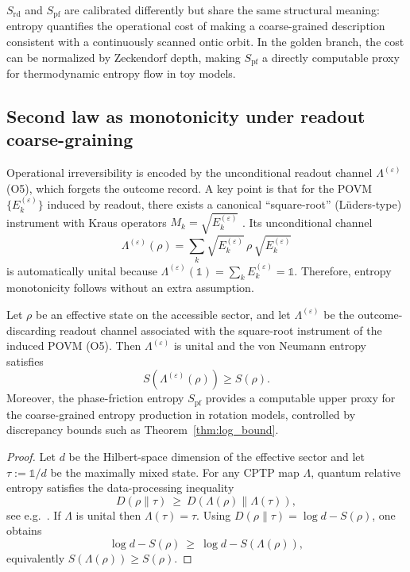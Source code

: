 \noindent $S_{\mathrm{rd}}$ and $S_{\mathrm{pf}}$ are calibrated differently but share the same structural meaning: entropy quantifies the operational cost of making a coarse-grained description consistent with a continuously scanned ontic orbit. In the golden branch, the cost can be normalized by Zeckendorf depth, making $S_{\mathrm{pf}}$ a directly computable proxy for thermodynamic entropy flow in toy models.

\subsection{Second law as monotonicity under readout coarse-graining}

Operational irreversibility is encoded by the unconditional readout channel $\Lambda^{(\varepsilon)}$ (O5), which forgets the outcome record. A key point is that for the POVM $\{E_k^{(\varepsilon)}\}$ induced by readout, there exists a canonical ``square-root'' (L\"uders-type) instrument with Kraus operators $M_k=\sqrt{E_k^{(\varepsilon)}}$ \cite{Kraus1983,NielsenChuang2000}. Its unconditional channel
\begin{equation}
  \Lambda^{(\varepsilon)}(\rho)=\sum_k \sqrt{E_k^{(\varepsilon)}}\,\rho\,\sqrt{E_k^{(\varepsilon)}}
\end{equation}
is automatically unital because $\Lambda^{(\varepsilon)}(\mathds{1})=\sum_k E_k^{(\varepsilon)}=\mathds{1}$. Therefore, entropy monotonicity follows without an extra assumption.

\begin{proposition}
\label{prop:second_law}
Let $\rho$ be an effective state on the accessible sector, and let $\Lambda^{(\varepsilon)}$ be the outcome-discarding readout channel associated with the square-root instrument of the induced POVM (O5). Then $\Lambda^{(\varepsilon)}$ is unital and the von Neumann entropy satisfies
\begin{equation}
S\!\left(\Lambda^{(\varepsilon)}(\rho)\right)\ge S(\rho).
\end{equation}
Moreover, the phase-friction entropy $S_{\mathrm{pf}}$ provides a computable upper proxy for the coarse-grained entropy production in rotation models, controlled by discrepancy bounds such as Theorem~\ref{thm:log_bound}.
\end{proposition}
\begin{proof}
Let $d$ be the Hilbert-space dimension of the effective sector and let $\tau:=\mathds{1}/d$ be the maximally mixed state. For any CPTP map $\Lambda$, quantum relative entropy satisfies the data-processing inequality
\begin{equation}
  D(\rho\|\tau)\ \ge\ D(\Lambda(\rho)\|\Lambda(\tau)),
\end{equation}
see e.g.\ \cite{NielsenChuang2000}. If $\Lambda$ is unital then $\Lambda(\tau)=\tau$. Using $D(\rho\|\tau)=\log d - S(\rho)$, one obtains
\begin{equation}
  \log d - S(\rho)\ \ge\ \log d - S(\Lambda(\rho)),
\end{equation}
equivalently $S(\Lambda(\rho))\ge S(\rho)$.
\end{proof}

